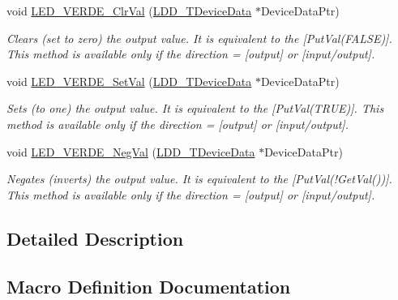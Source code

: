 \begin{DoxyCompactItemize}
void \hyperlink{group___l_e_d___v_e_r_d_e__module_ga9133ab63d8fc081fd37c9a9db071d4b1}{L\+E\+D\+\_\+\+V\+E\+R\+D\+E\+\_\+\+Clr\+Val} (\hyperlink{group___p_e___types__module_gac5cf1362f1f0e3a2ce71b1bf2276d091}{L\+D\+D\+\_\+\+T\+Device\+Data} $\ast$Device\+Data\+Ptr)
\begin{DoxyCompactList}\small\item\em Clears (set to zero) the output value. It is equivalent to the \mbox{[}Put\+Val(\+F\+A\+L\+S\+E)\mbox{]}. This method is available only if the direction = {\itshape \mbox{[}output\mbox{]}} or {\itshape \mbox{[}input/output\mbox{]}}. \end{DoxyCompactList}\item 
void \hyperlink{group___l_e_d___v_e_r_d_e__module_gaa4dced8b76919d67fc4a97e0f93c307a}{L\+E\+D\+\_\+\+V\+E\+R\+D\+E\+\_\+\+Set\+Val} (\hyperlink{group___p_e___types__module_gac5cf1362f1f0e3a2ce71b1bf2276d091}{L\+D\+D\+\_\+\+T\+Device\+Data} $\ast$Device\+Data\+Ptr)
\begin{DoxyCompactList}\small\item\em Sets (to one) the output value. It is equivalent to the \mbox{[}Put\+Val(\+T\+R\+U\+E)\mbox{]}. This method is available only if the direction = {\itshape \mbox{[}output\mbox{]}} or {\itshape \mbox{[}input/output\mbox{]}}. \end{DoxyCompactList}\item 
void \hyperlink{group___l_e_d___v_e_r_d_e__module_gad42f965a5adbc61441929cf942a1b9a7}{L\+E\+D\+\_\+\+V\+E\+R\+D\+E\+\_\+\+Neg\+Val} (\hyperlink{group___p_e___types__module_gac5cf1362f1f0e3a2ce71b1bf2276d091}{L\+D\+D\+\_\+\+T\+Device\+Data} $\ast$Device\+Data\+Ptr)
\begin{DoxyCompactList}\small\item\em Negates (inverts) the output value. It is equivalent to the \mbox{[}Put\+Val(!\+Get\+Val())\mbox{]}. This method is available only if the direction = {\itshape \mbox{[}output\mbox{]}} or {\itshape \mbox{[}input/output\mbox{]}}. \end{DoxyCompactList}\end{DoxyCompactItemize}


\subsection{Detailed Description}


\subsection{Macro Definition Documentation}
